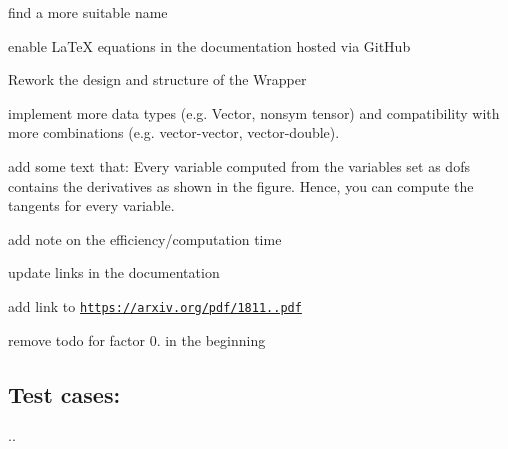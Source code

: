 \begin{DoxyItemize}
\item find a more suitable name
\item enable La\+TeX equations in the documentation hosted via Git\+Hub
\item Rework the design and structure of the Wrapper
\item implement more data types (e.\+g. Vector, nonsym tensor) and compatibility with more combinations (e.\+g. vector-\/vector, vector-\/double).
\item add some text that\+: Every variable computed from the variables set as dofs contains the derivatives as shown in the figure. Hence, you can compute the tangents for every variable.
\item add note on the efficiency/computation time
\item update links in the documentation
\item add link to \href{https://arxiv.org/pdf/1811.05031.pdf}{\tt https\+://arxiv.\+org/pdf/1811..\+pdf}
\item remove todo for factor 0. in the beginning
\end{DoxyItemize}

\subsection*{Test cases\+:}


\begin{DoxyItemize}
\item .. 
\end{DoxyItemize}